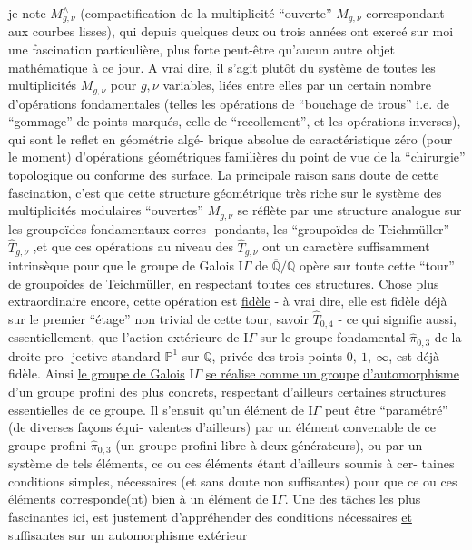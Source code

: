 
je note $M^{\wedge}_{g,\nu}$ (compactification de la multiplicité ``ouverte''
$M_{g,\nu}$ correspondant aux courbes lisses), qui depuis quelques deux
ou trois années ont exercé sur moi une fascination particulière,
plus forte peut-être qu'aucun autre objet mathématique à ce jour.
A vrai dire, il s'agit plutôt du système de \uline{toutes} les multiplicités
$M_{g,\nu}$ pour $g,\nu$ variables, liées entre elles par un certain nombre
d'opérations fondamentales (telles les opérations de ``bouchage de
trous'' i.e. de ``gommage'' de points marqués, celle de ``recollement'',
et les opérations inverses), qui sont le reflet en géométrie algé-%
brique absolue de caractéristique zéro (pour le moment) d'opérations
géométriques familières du point de vue de la ``chirurgie'' topologique
ou conforme des surface. La principale raison sans doute de cette
fascination, c'est que cette structure géométrique très riche sur le
système des multiplicités modulaires ``ouvertes'' $M_{g,\nu}$ se réflète
par une structure analogue sur les groupoïdes fondamentaux corres-%
pondants, les ``groupoïdes de Teichmüller'' $\hat{T}_{g,\nu}$ ,et que ces opérations
au niveau des $\hat{T}_{g,\nu}$ ont un caractère suffisamment intrinsèque pour
que le groupe de Galois $\mathrm{I}\!\Gamma$ de $\overline{\mathbb{Q}}/\mathbb{Q}$ opère sur toute cette ``tour'' de
groupoïdes de Teichmüller, en respectant toutes ces structures. Chose
plus extraordinaire encore, cette opération est \uline{fidèle} - à vrai dire,
elle est fidèle déjà sur le premier ``étage'' non trivial de cette tour,
savoir $\hat{T}_{0,4}$ - ce qui signifie aussi, essentiellement, que l'action
extérieure de $\mathrm{I}\!\Gamma$ sur le groupe fondamental $\hat{\pi}_{0,3}$ de la droite pro-%
jective standard $\mathbb{P}^1$ sur $\mathbb{Q}$, privée des trois points $0,\ 1,\ \infty$, est
déjà fidèle. Ainsi \uline{le groupe de Galois} $\mathrm{I}\!\Gamma$ \uline{se réalise comme un groupe}
\uline{d'automorphisme d'un groupe profini des plus concrets}, respectant
d'ailleurs certaines structures essentielles de ce groupe. Il s'ensuit
qu'un élément de $\mathrm{I}\!\Gamma$ peut être ``paramétré'' (de diverses façons équi-%
valentes d'ailleurs) par un élément convenable de ce groupe profini
$\hat{\pi}_{0,3}$ (un groupe profini libre à deux générateurs), ou par un système
de tels éléments, ce ou ces éléments étant d'ailleurs soumis à cer-%
taines conditions simples, nécessaires (et sans doute non suffisantes)
pour que ce ou ces éléments corresponde(nt) bien à un élément de $\mathrm{I}\!\Gamma$.
Une des tâches les plus fascinantes ici, est justement d'appréhender
des conditions nécessaires \uline{et} suffisantes sur un automorphisme extérieur

